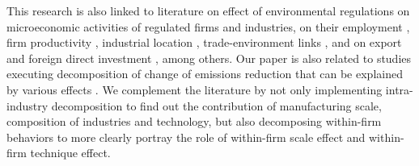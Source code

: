 \documentclass[12pt,english]{article}
\begin{document}
This research is also linked to literature on effect of environmental regulations on microeconomic activities of regulated firms and industries, on their employment \citep*{henderson1996effects,greenstone2002impacts,walker2013transitional}, firm productivity \citep*{berman2001environmental,greenstone2012effects}, industrial location \citep*{henderson1996effects,becker2000effects,chen2018consequences}, trade-environment links \citep*{gutierrez2018abatement}, and on export and foreign direct investment \citep*{keller2002pollution,cai2016does,shi2018environmental}, among others. Our paper is also related to studies executing decomposition of change of emissions reduction that can be explained by various effects \citep*{levinson2009technology,martin2011energy,shapiro2018pollution}. We complement the literature by not only implementing intra-industry decomposition to find out the contribution of manufacturing scale, composition of industries and technology, but also decomposing within-firm behaviors to more clearly portray the role of within-firm scale effect and within-firm technique effect. %
\end{document}
